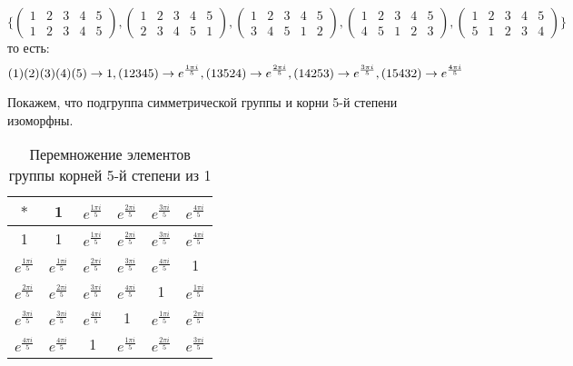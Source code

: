 \documentclass{article}
\begin{document}
\[
{\Big \{}
\begin{pmatrix}
1 & 2 & 3 & 4 & 5 \\
1 & 2 & 3 & 4 & 5
\end{pmatrix},
\begin{pmatrix}
1 & 2 & 3 & 4 & 5 \\
2 & 3 & 4 & 5 & 1
\end{pmatrix},
\begin{pmatrix}
1 & 2 & 3 & 4 & 5 \\
3 & 4 & 5 & 1 & 2
\end{pmatrix},
\begin{pmatrix}
1 & 2 & 3 & 4 & 5 \\
4 & 5 & 1 & 2 & 3
\end{pmatrix},
\begin{pmatrix}
1 & 2 & 3 & 4 & 5 \\
5 & 1 & 2 & 3 & 4
\end{pmatrix}
{\Big \}}
\]
\[
\]
то есть:
\[
(1)(2)(3)(4)(5) \rightarrow 1, \\
(1 2 3 4 5) \rightarrow e^{\frac {1\pi i}{5}}, \\
(1 3 5 2 4) \rightarrow e^{\frac {2\pi i}{5}}, \\
(1 4 2 5 3) \rightarrow e^{\frac {3\pi i}{5}}, \\
(1 5 4 3 2) \rightarrow e^{\frac {4\pi i}{5}} \\
\]

Покажем, что подгруппа симметрической группы и корни 5-й степени изоморфны.

\begin{table}[h]
  \centering
  \caption{Перемножение элементов группы корней 5-й степени из 1}
  \label{tab:my_table}
  \begin{tabular}{c|ccccc}
    $*$ & 1 & $e^{\frac {1\pi i}{5}}$ & $e^{\frac {2\pi i}{5}}$ & $e^{\frac {3\pi i}{5}}$ & $e^{\frac {4\pi i}{5}}$ \\
    \hline
    1 & 1 & $e^{\frac {1\pi i}{5}}$ & $e^{\frac {2\pi i}{5}}$ & $e^{\frac {3\pi i}{5}}$ & $e^{\frac {4\pi i}{5}}$ \\
    $e^{\frac {1\pi i}{5}}$ & $e^{\frac {1\pi i}{5}}$ & $e^{\frac {2\pi i}{5}}$ & $e^{\frac {3\pi i}{5}}$ & $e^{\frac {4\pi i}{5}}$ & 1 \\
    $e^{\frac {2\pi i}{5}}$ & $e^{\frac {2\pi i}{5}}$ & $e^{\frac {3\pi i}{5}}$ & $e^{\frac {4\pi i}{5}}$ & 1 & $e^{\frac {1\pi i}{5}}$ \\
    $e^{\frac {3\pi i}{5}}$ & $e^{\frac {3\pi i}{5}}$ & $e^{\frac {4\pi i}{5}}$ & 1 & $e^{\frac {1\pi i}{5}}$ & $e^{\frac {2\pi i}{5}}$ \\
    $e^{\frac {4\pi i}{5}}$ & $e^{\frac {4\pi i}{5}}$ & 1 & $e^{\frac {1\pi i}{5}}$ & $e^{\frac {2\pi i}{5}}$ & $e^{\frac {3\pi i}{5}}$ \\
  \end{tabular}
\end{table}
\end{document}
